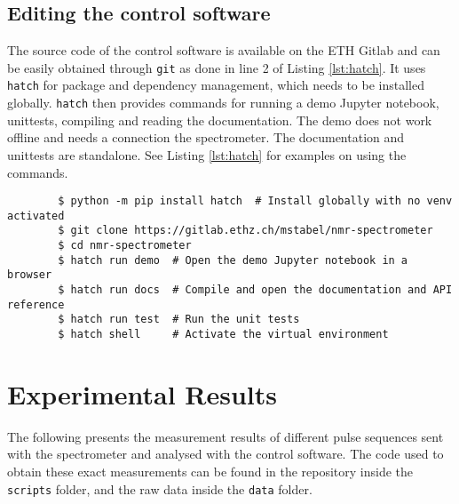 \section{Editing the control software}
The source code of the control software is available on the ETH Gitlab and can be easily obtained through \lstinline{git} as done in line 2 of Listing \ref{lst:hatch}. It uses \lstinline{hatch} for package and dependency management, which needs to be installed globally. \lstinline{hatch} then provides commands for running a demo Jupyter notebook, unittests, compiling and reading the documentation. The demo does not work offline and needs a connection the spectrometer. The documentation and unittests are standalone. See Listing \ref{lst:hatch} for examples on using the commands.

\begin{listing}[h!bt]
    \begin{verbatim}
        $ python -m pip install hatch  # Install globally with no venv activated
        $ git clone https://gitlab.ethz.ch/mstabel/nmr-spectrometer
        $ cd nmr-spectrometer
        $ hatch run demo  # Open the demo Jupyter notebook in a browser
        $ hatch run docs  # Compile and open the documentation and API reference
        $ hatch run test  # Run the unit tests
        $ hatch shell     # Activate the virtual environment
    \end{verbatim}
    \caption{. The invoked commands can be found in the \lstinline{pyprojects.toml} file in the repository. Examples for using the library are available in the \lstinline{scripts} and \lstinline{docs} folders.}
    \label{lst:hatch}
\end{listing}

\chapter{Experimental Results}
The following presents the measurement results of different pulse sequences sent with the spectrometer and analysed with the control software. The code used to obtain these exact measurements can be found in the repository inside the \lstinline{scripts} folder, and the raw data inside the \lstinline{data} folder.

